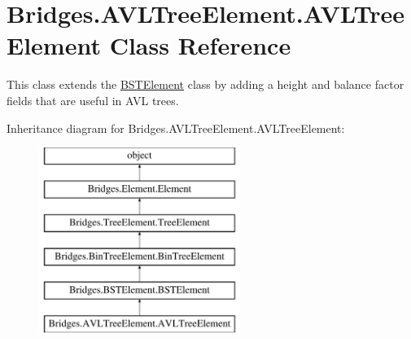 \hypertarget{class_bridges_1_1_a_v_l_tree_element_1_1_a_v_l_tree_element}{}\section{Bridges.\+A\+V\+L\+Tree\+Element.\+A\+V\+L\+Tree\+Element Class Reference}
\label{class_bridges_1_1_a_v_l_tree_element_1_1_a_v_l_tree_element}


This class extends the \hyperlink{namespace_bridges_1_1_b_s_t_element}{B\+S\+T\+Element} class by adding a height and balance factor fields that are useful in A\+V\+L trees.  


Inheritance diagram for Bridges.\+A\+V\+L\+Tree\+Element.\+A\+V\+L\+Tree\+Element\+:\begin{figure}[H]
\begin{center}
\leavevmode
\includegraphics[height=6.000000cm]{class_bridges_1_1_a_v_l_tree_element_1_1_a_v_l_tree_element}
\end{center}
\end{figure}
